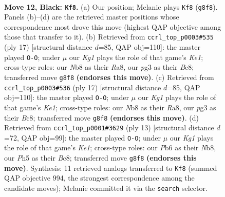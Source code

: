 \documentclass[11pt]{article}
\begin{document}
\clearpage

\begin{figure}[p]\centering
\begin{subfigure}{0.46\textwidth}\centering
\resizebox{\linewidth}{!}{%
\newchessgame
\chessboard[
  setfen={rnbqr1k1/p4pp1/1p3n2/3p3p/Pb1P3P/2NB1NP1/1P1K1P2/R1BQ3R b - - 2 12},
  showmover=false,
  pgfstyle=straightmove, color=movearrow, markmove={g8-f8}
]}
\caption{}
\end{subfigure}\hfill
\begin{subfigure}{0.46\textwidth}\centering
\resizebox{\linewidth}{!}{%
\newchessgame
\chessboard[
  setfen={r1bqk2r/pp3ppp/5n2/2np2B1/1b6/2N1PN2/PP3PPP/2RQKB1R b Kkq - 0 9},
  showmover=false,
  pgfstyle=straightmove, color=movearrow, markmove={e8-g8}
]}
\caption{}
\end{subfigure}
\\[4pt]
\begin{subfigure}{0.46\textwidth}\centering
\resizebox{\linewidth}{!}{%
\newchessgame
\chessboard[
  setfen={r1bqk2r/pp3ppp/5n2/2np2B1/1b6/2N1PN2/PP3PPP/2RQKB1R b Kkq - 0 9},
  showmover=false,
  pgfstyle=straightmove, color=movearrow, markmove={e8-g8}
]}
\caption{}
\end{subfigure}\hfill
\begin{subfigure}{0.46\textwidth}\centering
\resizebox{\linewidth}{!}{%
\newchessgame
\chessboard[
  setfen={rnbqk2r/1pp2ppp/p4n2/3p2B1/1bPP4/2N2N2/PP3PPP/R2QKB1R b KQkq - 5 7},
  showmover=false,
  pgfstyle=straightmove, color=movearrow, markmove={e8-g8}
]}
\caption{}
\end{subfigure}
\caption{\textbf{Move 12, Black: \texttt{Kf8}.} (a) Our position; Melanie plays \texttt{Kf8} (\texttt{g8f8}). Panels (b)--(d) are the retrieved master positions whose correspondence most drove this move (highest QAP objective among those that transfer to it). (b) Retrieved from \texttt{ccrl\_top\_p0003\#535} (ply 17) [structural distance $d$=85, QAP obj=110]: the master played \texttt{O-O}; under $\mu$ our \emph{Kg1} plays the role of that game's \emph{Ke1}; cross-type roles: our \emph{N}b8 as their \emph{R}a8, our \emph{p}g3 as their \emph{B}c8; transferred move \texttt{g8f8} \textbf{(endorses this move)}. (c) Retrieved from \texttt{ccrl\_top\_p0003\#536} (ply 17) [structural distance $d$=85, QAP obj=110]: the master played \texttt{O-O}; under $\mu$ our \emph{Kg1} plays the role of that game's \emph{Ke1}; cross-type roles: our \emph{N}b8 as their \emph{R}a8, our \emph{p}g3 as their \emph{B}c8; transferred move \texttt{g8f8} \textbf{(endorses this move)}. (d) Retrieved from \texttt{ccrl\_top\_p0001\#3629} (ply 13) [structural distance $d$=72, QAP obj=99]: the master played \texttt{O-O}; under $\mu$ our \emph{Kg1} plays the role of that game's \emph{Ke1}; cross-type roles: our \emph{P}b6 as their \emph{N}b8, our \emph{P}h5 as their \emph{B}c8; transferred move \texttt{g8f8} \textbf{(endorses this move)}. Synthesis: 11 retrieved analogs transferred to \texttt{Kf8} (summed QAP objective 994, the strongest correspondence among the candidate moves); Melanie committed it via the \texttt{search} selector.}
\label{fig:thought-m23}
\end{figure}
\end{document}
